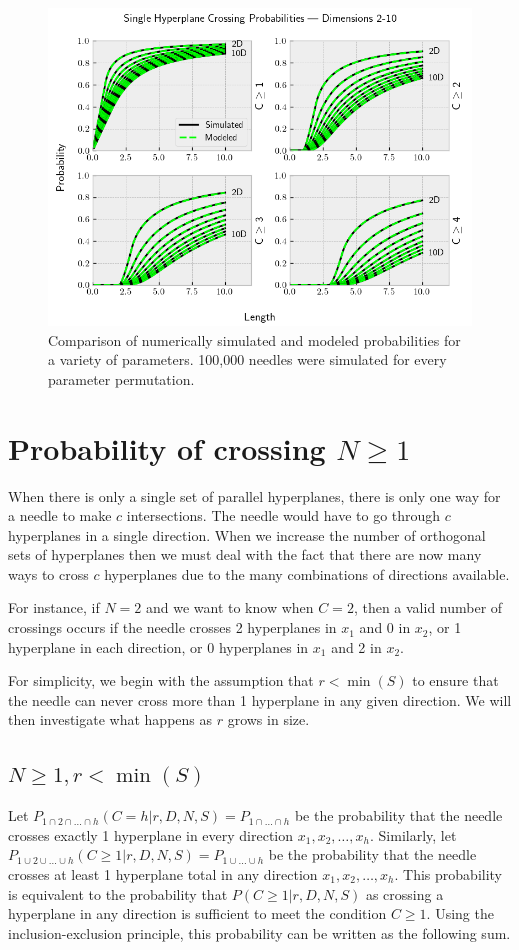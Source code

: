\documentclass{article}
\begin{document}
\begin{figure}[H]
	\centerline{\includegraphics[width=5in]{numeric_sim_N1.png}}
	\caption{Comparison of numerically simulated and modeled probabilities for a variety of parameters.
	100,000 needles were simulated for every parameter permutation.}
	\label{fig:numeric sim N1}
\end{figure}

\section{Probability of crossing $N\ge 1$}
When there is only a single set of parallel hyperplanes, there is only one way for a needle to make
$c$ intersections. The needle would have to go through $c$ hyperplanes in a single direction.
When we increase the number of orthogonal sets of hyperplanes then we must deal with the fact that
there are now many ways to cross $c$ hyperplanes due to the many combinations of directions available.

For instance, if $N=2$ and we want to know when $C=2$, then a valid number of crossings occurs if the
needle crosses 2 hyperplanes in $x_1$ and 0 in $x_2$, or 1 hyperplane in each direction, or 0 hyperplanes
in $x_1$ and 2 in $x_2$.

For simplicity, we begin with the assumption that $r<\min(S)$ to ensure that the needle can never cross
more than 1 hyperplane in any given direction. We will then investigate what happens as $r$ grows in
size.

\subsection{$N\ge 1, r<\min(S)$}
Let $P_{1\cap2\cap\hdots\cap h}(C=h|r,D,N,S)=P_{1\cap\hdots\cap h}$ be the probability that the
needle crosses exactly 1 hyperplane in every direction $x_1, x_2, \hdots, x_h$. Similarly,
let $P_{1\cup2\cup\hdots\cup h}(C\ge 1|r,D,N,S)=P_{1\cup\hdots\cup h}$ be the probability that
the needle crosses at least 1 hyperplane total in any direction $x_1, x_2, \hdots, x_h$. This probability
is equivalent to the probability that $P(C\ge 1|r,D,N,S)$ as crossing a hyperplane in any 
direction is sufficient to meet the condition $C\ge 1$. Using the inclusion-exclusion principle,
this probability can be written as the following sum.
\end{document}
